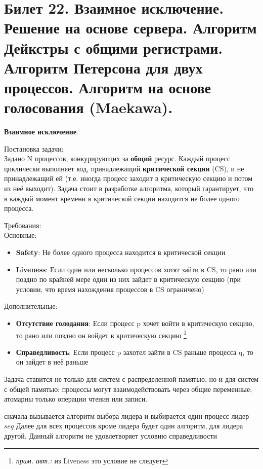 \newpage
\section {Билет 22. Взаимное исключение. Решение на основе сервера. Алгоритм Дейкстры с общими регистрами. Алгоритм Петерсона для двух процессов. Алгоритм на основе голосования (Maekawa).}
\textbf{Взаимное исключение}.

Постановка задачи: \\
Задано N процессов, конкурирующих за \textbf{общий} ресурс. Каждый процесс циклически выполняет код, принадлежащий \textbf{критической секции} (CS), и не принадлежащий ей (т.е. иногда процесс заходит в критическую секцию и потом из неё выходит).
Задача стоит в разработке алгоритма, который гарантирует, что в каждый момент времени в критической секции находится не более одного процесса.

Требования: \\
Основные:
\begin{itemize}
\item \textbf{Safety}: Не более одного процесса находится в критической секции
\item \textbf{Liveness}: Если один или несколько процессов хотят зайти в CS, то рано или поздно по крайней мере один из них зайдет в критическую секцию (при условии, что время нахождения процессов в CS ограничено)
\end{itemize}
Дополнительные:
\begin{itemize}
\item \textbf{Отсутствие голодания}: Если процесс p хочет войти в критическую секцию, то рано или поздно он войдет в критическую секцию \footnote{\textit{прим. авт.:} из Liveness это условие не следует} 
\item \textbf{Справедливость}: Если процесс p захотел зайти в CS раньше процесса q, то он зайдет в неё раньше
\end{itemize}

Задача ставится не только для систем с распределенной памятью, но и для систем с общей памятью: процессы могут взаимодействовать через общие переменные; атомарны только операции чтения или записи.

 сначала вызывается алгоритм выбора лидера и выбирается один процесс лидер $seq$
Далее для всех процессов кроме лидера будет один алгоритм, для лидера другой. Данный алгоритм не удовлетворяет условию справедливости


